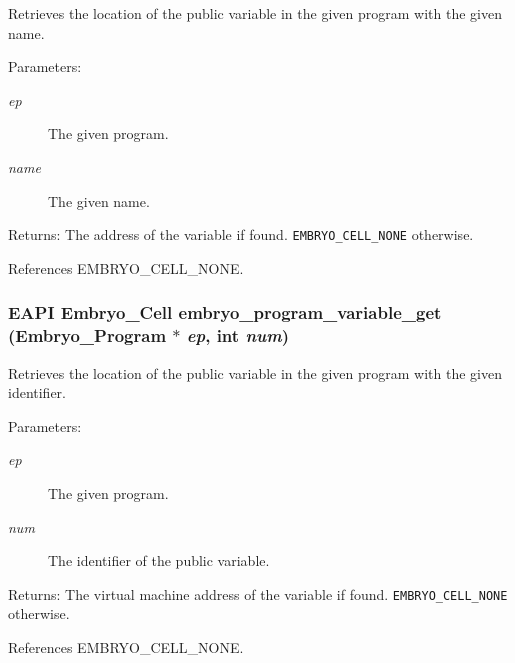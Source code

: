 Retrieves the location of the public variable in the given program with the given name. 

\begin{Desc}
\item[Parameters:]
\begin{description}
\item[{\em ep}]The given program. \item[{\em name}]The given name. \end{description}
\end{Desc}
\begin{Desc}
\item[Returns:]The address of the variable if found. {\tt EMBRYO\_\-CELL\_\-NONE} otherwise. \end{Desc}


References EMBRYO\_\-CELL\_\-NONE.\hypertarget{group__Embryo__Public__Variable__Group_g9f9174d8fdde8fdca879f61df78744bb}{
\subsubsection{\setlength{\rightskip}{0pt plus 5cm}EAPI Embryo\_\-Cell embryo\_\-program\_\-variable\_\-get (Embryo\_\-Program $\ast$ {\em ep}, \/  int {\em num})}}
\label{group__Embryo__Public__Variable__Group_g9f9174d8fdde8fdca879f61df78744bb}


Retrieves the location of the public variable in the given program with the given identifier. 

\begin{Desc}
\item[Parameters:]
\begin{description}
\item[{\em ep}]The given program. \item[{\em num}]The identifier of the public variable. \end{description}
\end{Desc}
\begin{Desc}
\item[Returns:]The virtual machine address of the variable if found. {\tt EMBRYO\_\-CELL\_\-NONE} otherwise. \end{Desc}


References EMBRYO\_\-CELL\_\-NONE.